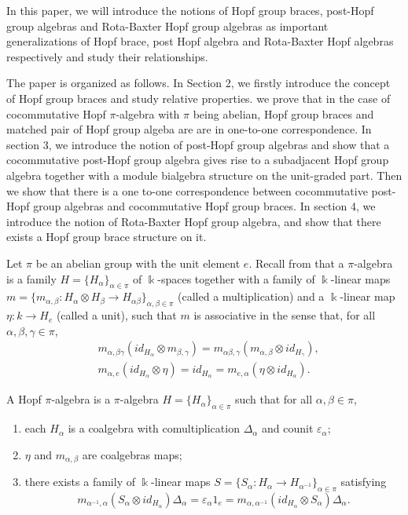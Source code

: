 \documentclass[11pt]{article}
\def\a{\alpha}
\def\b{\beta}
\def\g{\gamma}
\def\o{\otimes}
\def\v{\varepsilon}
\begin{document}
In this paper, we will introduce the notions of Hopf group braces, post-Hopf group algebras and Rota-Baxter Hopf group algebras as important generalizations of Hopf brace, post Hopf algebra and Rota-Baxter Hopf algebras respectively and study their relationships. 

The paper is organized as follows. In Section 2, we firstly introduce the concept of Hopf group braces and study relative properties. we prove that in the case of cocommutative Hopf $\pi$-algebra with $\pi$ being abelian,  Hopf group braces and matched pair of Hopf group algeba are are in one-to-one correspondence. In section 3, we introduce the notion of post-Hopf group algebras and show that a cocommutative post-Hopf group algebra gives rise to a subadjacent Hopf  group algebra together with a module bialgebra structure on the unit-graded part. Then we show that there is a one to-one correspondence between cocommutative post-Hopf  group algebras and cocommutative Hopf group braces. In section 4, we introduce the notion of Rota-Baxter Hopf group algebra, and show that there exists a Hopf group brace structure on it.

Let $\pi$ be an abelian group with the unit element $e$. Recall from \cite{Wang} that a $\pi$-algebra is a family $H=\{H_\a\}_{\a\in\pi}$ of $\Bbbk$-spaces together with a family of $\Bbbk$-linear maps $m=\{m_{\a,\b}:H_\a\o H_\b\rightarrow H_{\a\b}\}_{\a,\b\in\pi}$  (called a multiplication) and a $\Bbbk$-linear map $\eta:k\rightarrow H_e$ (called a unit), such that $m$ is associative in the sense that, for all $\a,\b,\g\in\pi$,
\begin{align*}
&m_{\a,\b\g}(id_{H_\a}\o m_{\b,\g})=m_{\a\b,\g}(m_{\a,\b}\o id_{H_\g}),\\
&m_{\a,e}(id_{H_\a}\o \eta)=id_{H_\a}=m_{e,\a}(\eta\o id_{H_\a}).
\end{align*}

A Hopf $\pi$-algebra is a $\pi$-algebra $H=\{H_\a\}_{\a\in\pi}$ such that for all $\a,\b\in\pi$,
\begin{enumerate}[\quad\rm(1)]
\item each $H_\a$ is a coalgebra with comultiplication $\Delta_\a$ and counit $\v _\a$;
\item $\eta$ and $m_{\a,\b}$ are coalgebras maps;
\item there exists a family of $\Bbbk$-linear maps $S=\{S_\a:H_\a\rightarrow H_{\a^{-1}}\}_{\a\in\pi}$ satisfying 
  $$m_{\a^{-1},\a}(S_\a\o id_{H_{\a}})\Delta_\a=\v _\a1_e=m_{\a,\a^{-1}}(id_{H_{\a}}\o S_\a)\Delta_\a.$$
\end{enumerate}
\end{document}
